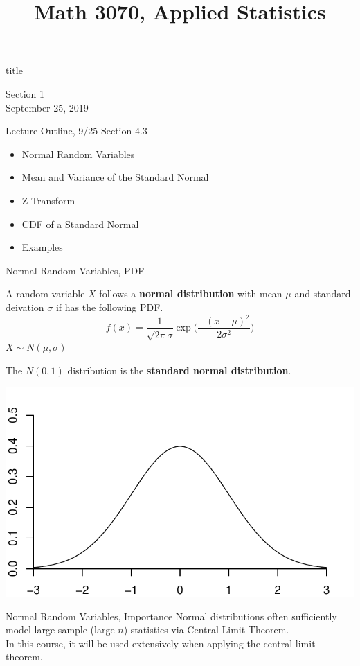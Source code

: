 \documentclass[handout]{beamer}
\title{Math 3070, Applied Statistics}
\newcommand{\nl}[1]{\vspace{#1 em}}
\begin{document}
\begin{frame}
    \begin{beamercolorbox}[rounded=true,wd=\textwidth,center]{title}
        \inserttitle
    \end{beamercolorbox}
    \begin{center}
        Section 1\\
        \nl{0.5}
        September 25, 2019
    \end{center}
\end{frame}
\begin{frame}{Lecture Outline, 9/25}
    Section 4.3
    \begin{itemize}
        \item Normal Random Variables
        \item Mean and Variance of the Standard Normal
        \item Z-Transform
        \item CDF of a Standard Normal
        \item Examples
    \end{itemize}
\end{frame}
\begin{frame}{Normal Random Variables, PDF}
    \begin{block}{}
        A random variable $X$ follows a \textbf{normal distribution} with mean $\mu$ and standard deivation $\sigma$ if has the following PDF.
        $$ f(x) = \frac{1}{\sqrt{2\pi} \sigma} \exp\bigg(\frac{-(x-\mu)^2}{2\sigma^2}\bigg) $$
        $X\sim N(\mu,\sigma)$
    \end{block}
    \begin{block}{}
        The $N(0,1)$ distribution is the \textbf{standard normal distribution}.
    \end{block}
    \begin{center}
        \includegraphics[scale=.4]{ch4_pdf_norm.pdf}
    \end{center}
    \vfill
\end{frame}
\begin{frame}{Normal Random Variables, Importance}
    Normal distributions often sufficiently model large sample (large $n$) statistics via Central Limit Theorem. \\ \nl{0.5}
    In this course, it will be used extensively when applying the central limit theorem.
\end{frame}
\end{document}
